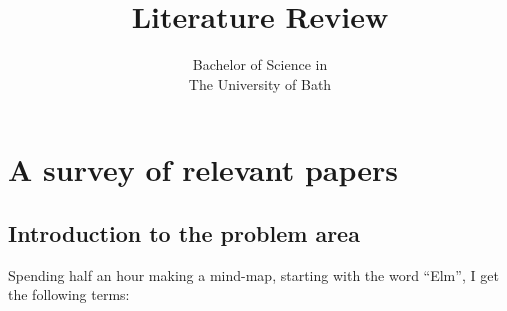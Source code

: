\documentclass[11pt,openright,a4paper]{report}
\title{Literature Review\\[1in]\disstitle}
\author{\authorname}
\date{Bachelor of Science in \degree\\The University of 
Bath\\\submissiondate}
\begin{document}
\setcounter{page}{0}

\maketitle
\newpage

\tableofcontents
\newpage

\setcounter{page}{1}

\chapter{A survey of relevant papers}

%
%
%

\section{Introduction to the problem area}

Spending half an hour making a mind-map, starting with the word ``Elm'', I get the following terms:
\end{document}
